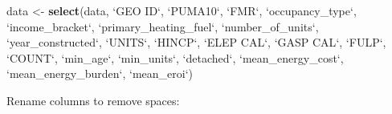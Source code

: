 \documentclass[]{article}
\newenvironment{Shaded}{\begin{snugshade}}{\end{snugshade}}
\newcommand{\DataTypeTok}[1]{\textcolor[rgb]{0.13,0.29,0.53}{#1}}
\newcommand{\KeywordTok}[1]{\textcolor[rgb]{0.13,0.29,0.53}{\textbf{#1}}}
\newcommand{\NormalTok}[1]{#1}
\newcommand{\StringTok}[1]{\textcolor[rgb]{0.31,0.60,0.02}{#1}}
\begin{document}
\begin{Shaded}
\begin{Highlighting}[]
\NormalTok{data <-}\StringTok{ }\KeywordTok{select}\NormalTok{(data,}
               \StringTok{`}\DataTypeTok{GEO ID}\StringTok{`}\NormalTok{,}
               \StringTok{`}\DataTypeTok{PUMA10}\StringTok{`}\NormalTok{,}
               \StringTok{`}\DataTypeTok{FMR}\StringTok{`}\NormalTok{,}
               \StringTok{`}\DataTypeTok{occupancy_type}\StringTok{`}\NormalTok{,}
               \StringTok{`}\DataTypeTok{income_bracket}\StringTok{`}\NormalTok{,}
               \StringTok{`}\DataTypeTok{primary_heating_fuel}\StringTok{`}\NormalTok{,}
               \StringTok{`}\DataTypeTok{number_of_units}\StringTok{`}\NormalTok{,}
               \StringTok{`}\DataTypeTok{year_constructed}\StringTok{`}\NormalTok{,}
               \StringTok{`}\DataTypeTok{UNITS}\StringTok{`}\NormalTok{, }
               \StringTok{`}\DataTypeTok{HINCP}\StringTok{`}\NormalTok{, }
               \StringTok{`}\DataTypeTok{ELEP CAL}\StringTok{`}\NormalTok{, }
               \StringTok{`}\DataTypeTok{GASP CAL}\StringTok{`}\NormalTok{, }
               \StringTok{`}\DataTypeTok{FULP}\StringTok{`}\NormalTok{, }
               \StringTok{`}\DataTypeTok{COUNT}\StringTok{`}\NormalTok{, }
               \StringTok{`}\DataTypeTok{min_age}\StringTok{`}\NormalTok{, }
               \StringTok{`}\DataTypeTok{min_units}\StringTok{`}\NormalTok{, }
               \StringTok{`}\DataTypeTok{detached}\StringTok{`}\NormalTok{,}
               \StringTok{`}\DataTypeTok{mean_energy_cost}\StringTok{`}\NormalTok{,}
               \StringTok{`}\DataTypeTok{mean_energy_burden}\StringTok{`}\NormalTok{,}
               \StringTok{`}\DataTypeTok{mean_eroi}\StringTok{`}\NormalTok{)}
\end{Highlighting}
\end{Shaded}

Rename columns to remove spaces:
\end{document}
